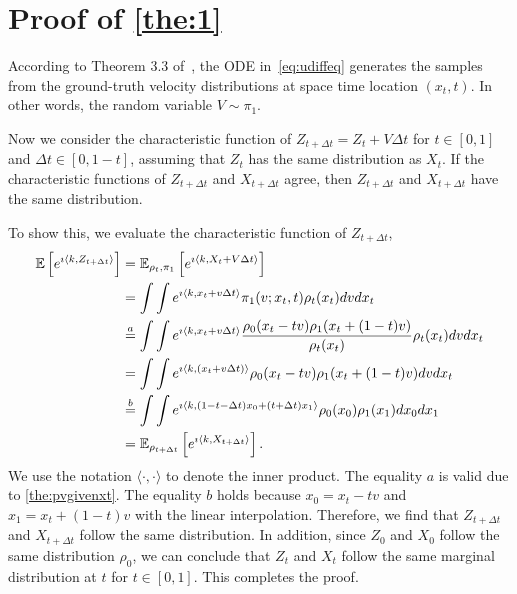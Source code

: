 \section{Proof of \cref{the:1}}
\label{sec:proof_thm_1}
According to Theorem 3.3 of~\citet{liu2023flow}, the ODE in~\cref{eq:udiffeq} generates the samples from the ground-truth velocity distributions at space time location $(x_t, t)$. In other words, the random variable $V \sim \pi_1$.

Now we consider the characteristic function of $Z_{t + \Delta t} = Z_t + V \Delta t$ for $t \in [0, 1]$ and $\Delta t \in [0, 1-t]$, assuming that $Z_t$ has the same distribution as $X_t$. If the characteristic functions of $Z_{t + \Delta t}$ and $X_{t + \Delta t}$ agree, then $Z_{t + \Delta t}$ and $X_{t + \Delta t}$ have the same distribution.
 
To show this, we evaluate the characteristic function of $Z_{t + \Delta t}$,
\begin{align}
 \mathbb{E} \left[e^{\imath \langle k, Z_{t + \Delta t} \rangle} \right] &= \mathbb{E}_{\rho_t, \pi_1 } \left[ e^{\imath \langle k, X_t + V \Delta t \rangle}  \right] \nonumber \\
& = \int \int e^{\imath \langle k, x_t + v \Delta t \rangle } \pi_1(v; x_t, t) \rho_t(x_t)  dv dx_t \nonumber \\
& \stackrel{a}{=} \int \int e^{\imath \langle k, x_t + v \Delta t \rangle }  \frac{\rho_0(x_t-t v) \rho_1 (x_t+(1-t)v)}{\rho_t(x_t)} {\rho_t (x_t)}  dv dx_t \nonumber \\
& = \int \int e^{\imath \langle k, (x_t + v \Delta t) \rangle } \rho_0 (x_t-t v) \rho_1 (x_t+(1-t)v)  dv dx_t \nonumber \\
& \stackrel{b}{=} \int \int e^{\imath \langle k, (1-t-\Delta t)x_0 + (t + \Delta t) x_1 \rangle }  \rho_0(x_0) \rho_1(x_1)  dx_0 dx_1 \nonumber \\
& = \mathbb{E}_{\rho_{t + \Delta t}} \left[e^{\imath \langle k,  X_{t + \Delta t} \rangle }  \right]. 
\end{align}
We use the notation $\langle \cdot, \cdot \rangle$ to denote the inner product. The equality $a$ is valid due to \cref{the:pvgivenxt}. 
The equality $b$ holds because $x_0 = x_t - tv$ and $x_1 = x_t + (1-t) v$ with the linear interpolation. Therefore, we find that $Z_{t + \Delta t}$ and $X_{t + \Delta t}$ follow the same distribution.  In addition, since $Z_0$ and $X_0$ follow the same distribution $\rho_0$, we can conclude that $Z_t$ and $X_t$ follow the same marginal distribution at $t$ for $t \in [0, 1]$. This completes the proof. 
